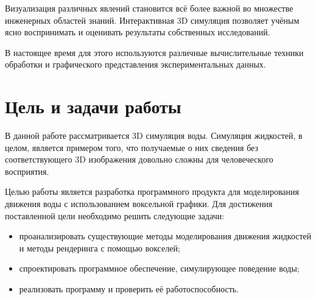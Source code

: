 \Introduction

Визуализация различных явлений становится всё более важной во множестве инженерных
областей знаний. Интерактивная 3D симуляция позволяет учёным ясно воспринимать и
оценивать результаты собственных исследований.

В настоящее время для этого используются различные вычислительные техники обработки
 и графического представления экспериментальных данных.

\section{Цель и задачи работы}

В данной работе рассматривается 3D симуляция воды. Симуляция жидкостей, в целом,
является примером того, что получаемые о них сведения без соответствующего 3D изображения
довольно сложны для человеческого восприятия.

Целью работы является разработка программного продукта для моделирования движения воды с использованием воксельной графики. Для достижения поставленной цели необходимо решить следующие задачи:

\begin{itemize}
\item проанализировать существующие методы моделирования движения жидкостей и методы рендеринга с помощью вокселей;
\item спроектировать программное обеспечение, симулирующее поведение воды;
\item реализовать программу и проверить её работоспособность.
\end{itemize}
